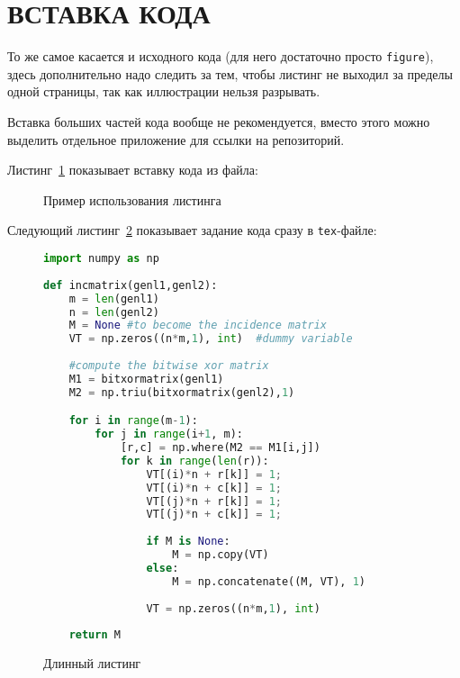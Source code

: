\section{ВСТАВКА КОДА}

То же самое касается и исходного кода (для него достаточно просто \texttt{figure}), здесь дополнительно надо следить за тем, чтобы листинг не выходил за пределы одной страницы, так как иллюстрации нельзя разрывать.

Вставка больших частей кода вообще не рекомендуется, вместо этого можно выделить отдельное приложение для ссылки на репозиторий.

Листинг~\ref{src:src1} показывает вставку кода из файла:

\begin{figure}

\caption{Пример использования листинга}
\label{src:src1}
\end{figure}

\pagebreak

Следующий листинг~\ref{src:src2} показывает задание кода сразу в \texttt{tex}-файле:

\begin{figure}
\begin{lstlisting}[language=Python]
import numpy as np
    
def incmatrix(genl1,genl2):
    m = len(genl1)
    n = len(genl2)
    M = None #to become the incidence matrix
    VT = np.zeros((n*m,1), int)  #dummy variable
    
    #compute the bitwise xor matrix
    M1 = bitxormatrix(genl1)
    M2 = np.triu(bitxormatrix(genl2),1) 

    for i in range(m-1):
        for j in range(i+1, m):
            [r,c] = np.where(M2 == M1[i,j])
            for k in range(len(r)):
                VT[(i)*n + r[k]] = 1;
                VT[(i)*n + c[k]] = 1;
                VT[(j)*n + r[k]] = 1;
                VT[(j)*n + c[k]] = 1;
                
                if M is None:
                    M = np.copy(VT)
                else:
                    M = np.concatenate((M, VT), 1)
                
                VT = np.zeros((n*m,1), int)
    
    return M
\end{lstlisting}
\caption{Длинный листинг}
\label{src:src2}
\end{figure}